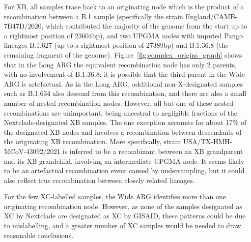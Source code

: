 \documentclass{article}
\begin{document}
For XB, all samples trace back to an originating node which is the product of a
recombination between a B.1 sample (specifically the strain
England/CAMB-7B47D/2020, which contributed the majority of
the genome from the start up to a rightmost position of 23604bp), and two
UPGMA nodes with imputed Pango lineages B.1.627 (up to a rightmost position of
27389bp) and B.1.36.8 (the remaining fragment of the genome). Figure~\ref{fig:complex_origins_graph}
shows that in the Long ARG the equivalent recombination node has only 2 parents,
with no involvement of  B.1.36.8; it is possible that the third parent in
the Wide ARG is artefactual. As in the Long ARG, additional
non-X-designated samples such as B.1.634 also descend from this recombination,
and there are also a small number of nested recombination nodes. However, all but
one of these nested recombinations are unimportant, being ancestral to negligible fractions
of the Nextclade-designated XB samples. The one exception accounts for about 17\% of the
designated XB nodes and involves a recombination between descendants of the
originating XB recombination. More specifically, strain
USA/TX-HMH-MCoV-43092/2021 is inferred to be a recombinant
between an XB grandparent and its XB grandchild, involving an intermediate UPGMA node.
It seems likely to be an artefactual recombination event caused by undersampling, but it could also reflect true recombination between closely related lineages.

For the few XC-labelled samples, the Wide ARG identifies more than one
originating recombination node. However, as none of the samples designated as
XC by Nextclade are designated as XC by GISAID, these patterns could be due to
mislabelling, and a greater number of XC samples would be needed to draw reasonable
conclusions.


\end{document}
